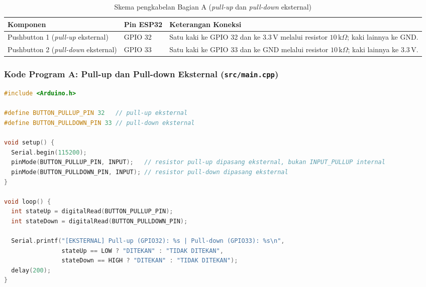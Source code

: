 \begin{table}[htbp]
    \centering
    \caption{Skema pengkabelan Bagian A (\textit{pull-up} dan \textit{pull-down} eksternal)}
    \label{tab:wiring_pull_eksternal}
    \begin{tabularx}{\textwidth}{l l X}
        \toprule
        \textbf{Komponen} & \textbf{Pin ESP32} & \textbf{Keterangan Koneksi} \\
        \midrule
        Pushbutton 1 (\textit{pull-up} eksternal)   & GPIO 32 & Satu kaki ke GPIO 32 dan ke $3.3\,\text{V}$ melalui resistor $10\,\text{k}\Omega$; kaki lainnya ke GND. \\
        Pushbutton 2 (\textit{pull-down} eksternal) & GPIO 33 & Satu kaki ke GPIO 33 dan ke GND melalui resistor $10\,\text{k}\Omega$; kaki lainnya ke $3.3\,\text{V}$. \\
        \bottomrule
    \end{tabularx}
\end{table}

\subsubsection*{Kode Program A: Pull-up dan Pull-down Eksternal (\texttt{src/main.cpp})}
\begin{lstlisting}[language=C++]
#include <Arduino.h>

#define BUTTON_PULLUP_PIN 32   // pull-up eksternal
#define BUTTON_PULLDOWN_PIN 33 // pull-down eksternal

void setup() {
  Serial.begin(115200);
  pinMode(BUTTON_PULLUP_PIN, INPUT);   // resistor pull-up dipasang eksternal, bukan INPUT_PULLUP internal
  pinMode(BUTTON_PULLDOWN_PIN, INPUT); // resistor pull-down dipasang eksternal
}

void loop() {
  int stateUp = digitalRead(BUTTON_PULLUP_PIN);
  int stateDown = digitalRead(BUTTON_PULLDOWN_PIN);

  Serial.printf("[EKSTERNAL] Pull-up (GPIO32): %s | Pull-down (GPIO33): %s\n",
                stateUp == LOW ? "DITEKAN" : "TIDAK DITEKAN",
                stateDown == HIGH ? "DITEKAN" : "TIDAK DITEKAN");
  delay(200);
}
\end{lstlisting}


